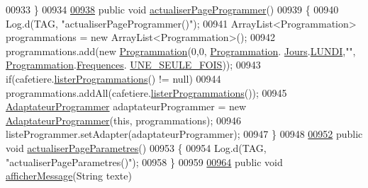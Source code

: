 \begin{DoxyCode}
{00933     \}
00934 
\hyperlink{classcom_1_1example_1_1ekawa_1_1_ihm_adbeeac61b5a53c52d21da490659de983}{00938}     \textcolor{keyword}{public} \textcolor{keywordtype}{void} \hyperlink{classcom_1_1example_1_1ekawa_1_1_ihm_adbeeac61b5a53c52d21da490659de983}{actualiserPageProgrammer}()
00939     \{
00940         Log.d(TAG, \textcolor{stringliteral}{"actualiserPageProgrammer()"});
00941         ArrayList<Programmation> programmations = \textcolor{keyword}{new} ArrayList<Programmation>();
00942         programmations.add(\textcolor{keyword}{new} \hyperlink{classcom_1_1example_1_1ekawa_1_1_programmation}{Programmation}(0,0, \hyperlink{classcom_1_1example_1_1ekawa_1_1_programmation}{Programmation}.
      \hyperlink{classcom_1_1example_1_1ekawa_1_1_programmation_1_1_jours}{Jours}.\hyperlink{classcom_1_1example_1_1ekawa_1_1_programmation_1_1_jours_af73668910813425a74baccc5940153ef}{LUNDI},\textcolor{stringliteral}{""}, \hyperlink{classcom_1_1example_1_1ekawa_1_1_programmation}{Programmation}.\hyperlink{classcom_1_1example_1_1ekawa_1_1_programmation_1_1_frequences}{Frequences}.
      \hyperlink{classcom_1_1example_1_1ekawa_1_1_programmation_1_1_frequences_a92b76aab3e8479b140194ab329a0f3de}{UNE\_SEULE\_FOIS}));
00943         \textcolor{keywordflow}{if}(cafetiere.\hyperlink{classcom_1_1example_1_1ekawa_1_1_cafetiere_af82120eee3f2f7dbb28f74e663bfe15a}{listerProgrammations}() != null)
00944             programmations.addAll(cafetiere.\hyperlink{classcom_1_1example_1_1ekawa_1_1_cafetiere_af82120eee3f2f7dbb28f74e663bfe15a}{listerProgrammations}());
00945         \hyperlink{classcom_1_1example_1_1ekawa_1_1_ihm_1_1_adaptateur_programmer}{AdaptateurProgrammer} adaptateurProgrammer = \textcolor{keyword}{new} 
      \hyperlink{classcom_1_1example_1_1ekawa_1_1_ihm_1_1_adaptateur_programmer}{AdaptateurProgrammer}(\textcolor{keyword}{this}, programmations);
00946         listeProgrammer.setAdapter(adaptateurProgrammer);
00947     \}
00948 
\hyperlink{classcom_1_1example_1_1ekawa_1_1_ihm_a7eca80c1cbf9a0f0f5c82dd79d32f4f4}{00952}     \textcolor{keyword}{public} \textcolor{keywordtype}{void} \hyperlink{classcom_1_1example_1_1ekawa_1_1_ihm_a7eca80c1cbf9a0f0f5c82dd79d32f4f4}{actualiserPageParametres}()
00953     \{
00954         Log.d(TAG, \textcolor{stringliteral}{"actualiserPageParametres()"});
00958     \}
00959 
\hyperlink{classcom_1_1example_1_1ekawa_1_1_ihm_ab1ca33ad18d42540299e3a58a82f4d9a}{00964}     \textcolor{keyword}{public} \textcolor{keywordtype}{void} \hyperlink{classcom_1_1example_1_1ekawa_1_1_ihm_ab1ca33ad18d42540299e3a58a82f4d9a}{afficherMessage}(String texte)
}
\end{DoxyCode}
